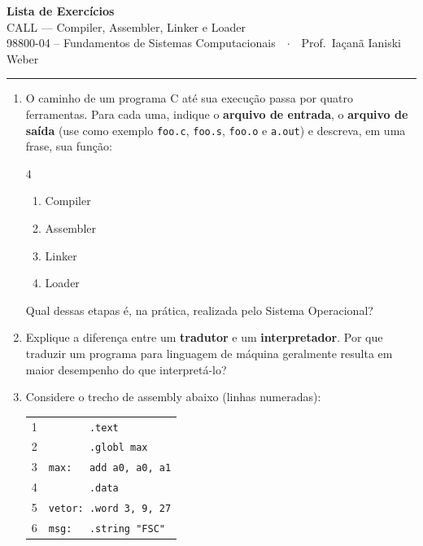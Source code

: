 \documentclass[11pt, a4paper]{article}
\begin{document}
\begin{center}
  {\Large \textbf{Lista de Exerc\'{i}cios}}\\[2pt]
  {\large CALL --- Compiler, Assembler, Linker e Loader}\\[3pt]
  {\normalsize 98800-04 -- Fundamentos de Sistemas Computacionais\ \ $\cdot$\ \ Prof.\ Ia\c{c}an\~{a} Ianiski Weber}
\end{center}

\vspace{1pt}
\hrule
\vspace{5pt}

\begin{enumerate}

\item O caminho de um programa C at\'{e} sua execu\c{c}\~{a}o passa por quatro ferramentas. Para cada uma, indique o \textbf{arquivo de entrada}, o \textbf{arquivo de sa\'{i}da} (use como exemplo \texttt{foo.c}, \texttt{foo.s}, \texttt{foo.o} e \texttt{a.out}) e descreva, em uma frase, sua fun\c{c}\~{a}o:
\begin{multicols}{4}
\begin{enumerate}
  \item Compiler
  \item Assembler
  \item Linker
  \item Loader
\end{enumerate}
\end{multicols}
Qual dessas etapas \'{e}, na pr\'{a}tica, realizada pelo Sistema Operacional?

\item Explique a diferen\c{c}a entre um \textbf{tradutor} e um \textbf{interpretador}. Por que traduzir um programa para linguagem de m\'{a}quina geralmente resulta em maior desempenho do que interpret\'{a}-lo?

\item Considere o trecho de assembly abaixo (linhas numeradas):

\begin{center}
\small
\begin{tabular}{rl}
1 & \texttt{\ \ \ \ \ \ \ .text}\\
2 & \texttt{\ \ \ \ \ \ \ .globl max}\\
3 & \texttt{max:\ \ \ add a0, a0, a1}\\
4 & \texttt{\ \ \ \ \ \ \ .data}\\
5 & \texttt{vetor:\ .word 3, 9, 27}\\
6 & \texttt{msg:\ \ \ .string "FSC"}\\
\end{tabular}
\end{center}


\end{enumerate}
\end{document}
